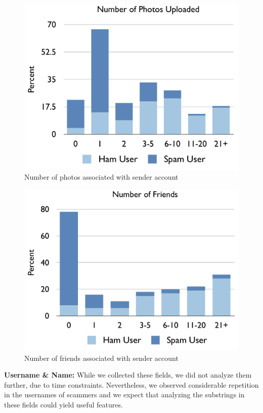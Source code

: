 \documentclass[preprint]{acm_proc_article-sp}
\begin{document}
\begin{figure}[h]
    \centering
    \includegraphics[width=\linewidth]{figures/photos.pdf}
    \caption{Number of photos associated with sender account}
    \label{fig:photos}
\end{figure}

\begin{figure}[h]
    \centering
    \includegraphics[width=\linewidth]{figures/friends.pdf}
    \caption{Number of friends associated with sender account}
    \label{fig:friends}
\end{figure}

\textbf{Username \& Name:} While we collected these fields, we did not analyze them further, due to 
time constraints. Nevertheless, we observed considerable repetition in the usernames of scammers 
and we expect that analyzing the substrings in these fields could yield useful features.
\end{document}
